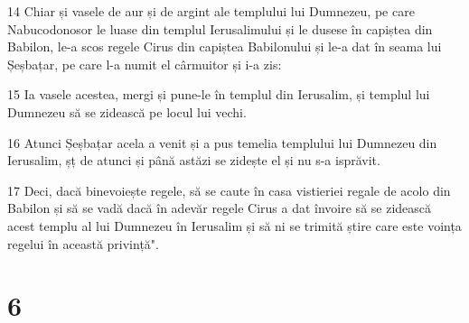 \par 14 Chiar și vasele de aur și de argint ale templului lui Dumnezeu, pe care Nabucodonosor le luase din templul Ierusalimului și le dusese în capiștea din Babilon, le-a scos regele Cirus din capiștea Babilonului și le-a dat în seama lui Șeșbațar, pe care l-a numit el cârmuitor și i-a zis:
\par 15 Ia vasele acestea, mergi și pune-le în templul din Ierusalim, și templul lui Dumnezeu să se zidească pe locul lui vechi.
\par 16 Atunci Șeșbațar acela a venit și a pus temelia templului lui Dumnezeu din Ierusalim, șț de atunci și până astăzi se zidește el și nu s-a isprăvit.
\par 17 Deci, dacă binevoiește regele, să se caute în casa vistieriei regale de acolo din Babilon și să se vadă dacă în adevăr regele Cirus a dat învoire să se zidească acest templu al lui Dumnezeu în Ierusalim și să ni se trimită știre care este voința regelui în această privință".

\chapter{6}

